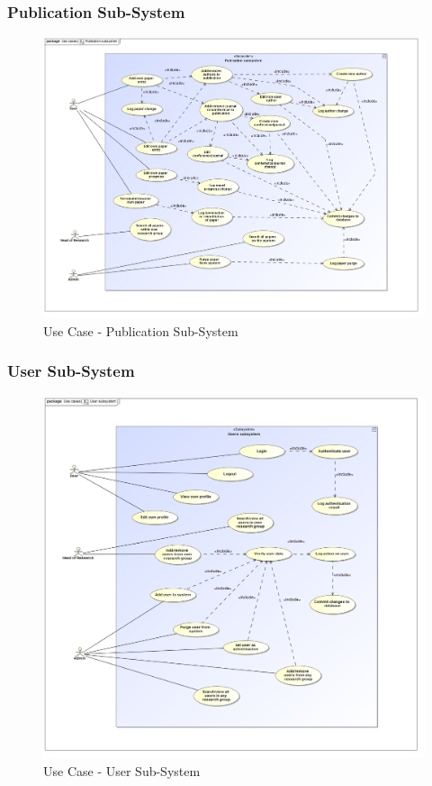 \documentclass{article}
\begin{document}
			\subsubsection{Publication Sub-System}
			\begin{figure}[H]
				\includegraphics[width=\linewidth]{../Diagrams/Use Cases/Publication subsystem.jpg}
				\caption{Use Case - Publication Sub-System}
			\end{figure}
			
			\cleardoublepage
			\subsubsection{User Sub-System}
			\begin{figure}[H]
				\includegraphics[width=\linewidth]{../Diagrams/Use Cases/User subsystem.jpg}
				\caption{Use Case - User Sub-System}
			\end{figure}
			
\end{document}
